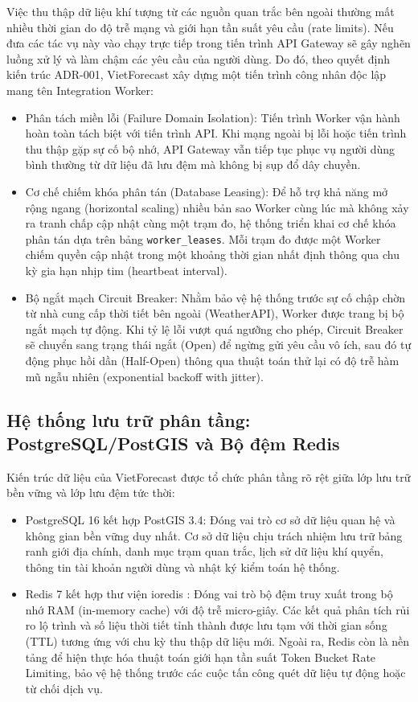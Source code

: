 Việc thu thập dữ liệu khí tượng từ các nguồn quan trắc bên ngoài thường mất nhiều thời gian do độ trễ mạng và giới hạn tần suất yêu cầu (rate limits). Nếu đưa các tác vụ này vào chạy trực tiếp trong tiến trình API Gateway sẽ gây nghẽn luồng xử lý và làm chậm các yêu cầu của người dùng. Do đó, theo quyết định kiến trúc ADR-001, VietForecast xây dựng một tiến trình công nhân độc lập mang tên Integration Worker:
\begin{itemize}
    \item[-] Phân tách miền lỗi (Failure Domain Isolation): Tiến trình Worker vận hành hoàn toàn tách biệt với tiến trình API. Khi mạng ngoài bị lỗi hoặc tiến trình thu thập gặp sự cố bộ nhớ, API Gateway vẫn tiếp tục phục vụ người dùng bình thường từ dữ liệu đã lưu đệm mà không bị sụp đổ dây chuyền.
    \item[-] Cơ chế chiếm khóa phân tán (Database Leasing): Để hỗ trợ khả năng mở rộng ngang (horizontal scaling) nhiều bản sao Worker cùng lúc mà không xảy ra tranh chấp cập nhật cùng một trạm đo, hệ thống triển khai cơ chế khóa phân tán dựa trên bảng \texttt{worker\_leases}. Mỗi trạm đo được một Worker chiếm quyền cập nhật trong một khoảng thời gian nhất định thông qua chu kỳ gia hạn nhịp tim (heartbeat interval).
    \item[-] Bộ ngắt mạch Circuit Breaker: Nhằm bảo vệ hệ thống trước sự cố chập chờn từ nhà cung cấp thời tiết bên ngoài (WeatherAPI), Worker được trang bị bộ ngắt mạch tự động. Khi tỷ lệ lỗi vượt quá ngưỡng cho phép, Circuit Breaker sẽ chuyển sang trạng thái ngắt (Open) để ngừng gửi yêu cầu vô ích, sau đó tự động phục hồi dần (Half-Open) thông qua thuật toán thử lại có độ trễ hàm mũ ngẫu nhiên (exponential backoff with jitter).
\end{itemize}

\subsection{Hệ thống lưu trữ phân tầng: PostgreSQL/PostGIS và Bộ đệm Redis}

Kiến trúc dữ liệu của VietForecast được tổ chức phân tầng rõ rệt giữa lớp lưu trữ bền vững và lớp lưu đệm tức thời:
\begin{itemize}
    \item[-] PostgreSQL 16 kết hợp PostGIS 3.4: Đóng vai trò cơ sở dữ liệu quan hệ và không gian bền vững duy nhất. Cơ sở dữ liệu chịu trách nhiệm lưu trữ bảng ranh giới địa chính, danh mục trạm quan trắc, lịch sử dữ liệu khí quyển, thông tin tài khoản người dùng và nhật ký kiểm toán hệ thống.
    \item[-] Redis 7 kết hợp thư viện ioredis \cite{redis2024}: Đóng vai trò bộ đệm truy xuất trong bộ nhớ RAM (in-memory cache) với độ trễ micro-giây. Các kết quả phân tích rủi ro lộ trình và số liệu thời tiết tỉnh thành được lưu tạm với thời gian sống (TTL) tương ứng với chu kỳ thu thập dữ liệu mới. Ngoài ra, Redis còn là nền tảng để hiện thực hóa thuật toán giới hạn tần suất Token Bucket Rate Limiting, bảo vệ hệ thống trước các cuộc tấn công quét dữ liệu tự động hoặc từ chối dịch vụ.
\end{itemize}

